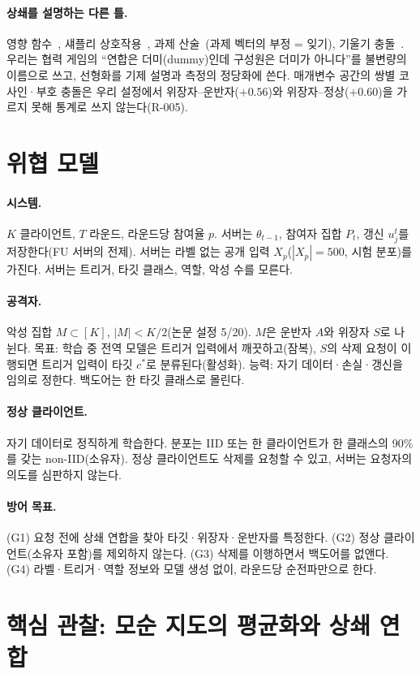 \documentclass[10pt,a4paper]{article}
\begin{document}
\paragraph{상쇄를 설명하는 다른 틀.}
영향 함수~\cite{koh2017}, 섀플리 상호작용~\cite{grabisch}, 과제 산술~\cite{ilharco}(과제 벡터의 부정 = 잊기), 기울기 충돌~\cite{pcgrad}. 우리는 협력 게임의 ``연합은 더미(dummy)인데 구성원은 더미가 아니다''를 불변량의 이름으로 쓰고, 선형화를 기제 설명과 측정의 정당화에 쓴다. 매개변수 공간의 쌍별 코사인·부호 충돌은 우리 설정에서 위장자--운반자($+0.56$)와 위장자--정상($+0.60$)을 가르지 못해 통계로 쓰지 않는다(R-005).

\section{위협 모델}\label{sec:threat}
\paragraph{시스템.} $K$ 클라이언트, $T$ 라운드, 라운드당 참여율 $p$. 서버는 $\theta_{t-1}$, 참여자 집합 $P_t$, 갱신 $u_j^t$를 저장한다(FU 서버의 전제). 서버는 라벨 없는 공개 입력 $X_p$($|X_p|=500$, 시험 분포)를 가진다. 서버는 트리거, 타깃 클래스, 역할, 악성 수를 모른다.
\paragraph{공격자.} 악성 집합 $M\subset[K]$, $|M|<K/2$(논문 설정 5/20). $M$은 운반자 $A$와 위장자 $S$로 나뉜다. 목표: 학습 중 전역 모델은 트리거 입력에서 깨끗하고(잠복), $S$의 삭제 요청이 이행되면 트리거 입력이 타깃 $c^*$로 분류된다(활성화). 능력: 자기 데이터·손실·갱신을 임의로 정한다. 백도어는 한 타깃 클래스로 몰린다.
\paragraph{정상 클라이언트.} 자기 데이터로 정직하게 학습한다. 분포는 IID 또는 한 클라이언트가 한 클래스의 90\%를 갖는 non-IID(소유자). 정상 클라이언트도 삭제를 요청할 수 있고, 서버는 요청자의 의도를 심판하지 않는다.
\paragraph{방어 목표.} (G1) 요청 전에 상쇄 연합을 찾아 타깃·위장자·운반자를 특정한다. (G2) 정상 클라이언트(소유자 포함)를 제외하지 않는다. (G3) 삭제를 이행하면서 백도어를 없앤다. (G4) 라벨·트리거·역할 정보와 모델 생성 없이, 라운드당 순전파만으로 한다.

\section{핵심 관찰: 모순 지도의 평균화와 상쇄 연합}\label{sec:obs}
\end{document}
